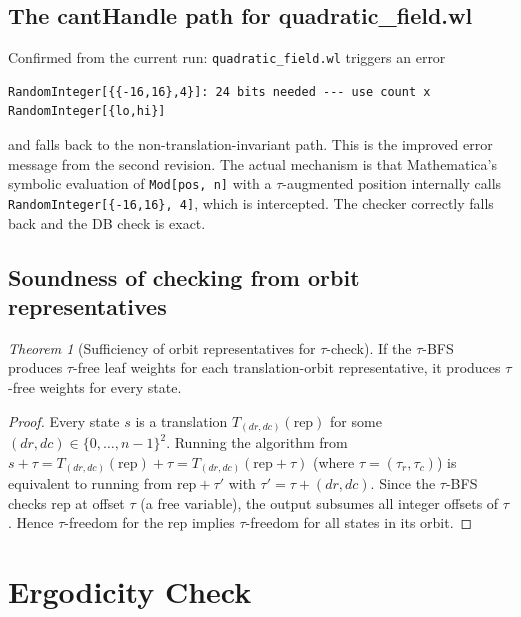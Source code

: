 \documentclass[12pt,a4paper]{article}
\theoremstyle{critical}
\theoremstyle{remark}
\newtheorem{theorem}{Theorem}
\theoremstyle{verified}
\begin{document}
\subsection{The cantHandle path for quadratic\_field.wl}

Confirmed from the current run: \texttt{quadratic\_field.wl} triggers an error
\begin{lstlisting}
RandomInteger[{{-16,16},4}]: 24 bits needed --- use count x RandomInteger[{lo,hi}]
\end{lstlisting}
and falls back to the non-translation-invariant path.  This is the improved error
message from the second revision.  The actual mechanism is that Mathematica's
symbolic evaluation of \texttt{Mod[pos, n]} with a $\tau$-augmented position
internally calls \texttt{RandomInteger[\{-16,16\}, 4]}, which is intercepted.
The checker correctly falls back and the DB check is exact.

\subsection{Soundness of checking from orbit representatives}

\begin{theorem}[Sufficiency of orbit representatives for $\tau$-check]
If the $\tau$-BFS produces $\tau$-free leaf weights for each translation-orbit
representative, it produces $\tau$-free weights for every state.
\end{theorem}

\begin{proof}
Every state $s$ is a translation $T_{(dr,dc)}(\text{rep})$ for some
$(dr,dc) \in \{0,\ldots,n-1\}^2$.  Running the algorithm from $s + \tau =
T_{(dr,dc)}(\text{rep}) + \tau = T_{(dr,dc)}(\text{rep} + \tau)$ (where
$\tau = (\tau_r, \tau_c)$) is equivalent to running from $\text{rep} + \tau'$
with $\tau' = \tau + (dr, dc)$.  Since the $\tau$-BFS checks rep at offset $\tau$
(a free variable), the output subsumes all integer offsets of $\tau$.  Hence
$\tau$-freedom for the rep implies $\tau$-freedom for all states in its orbit.
\end{proof}

\section{Ergodicity Check}
\label{sec:ergodicity}
\end{document}
